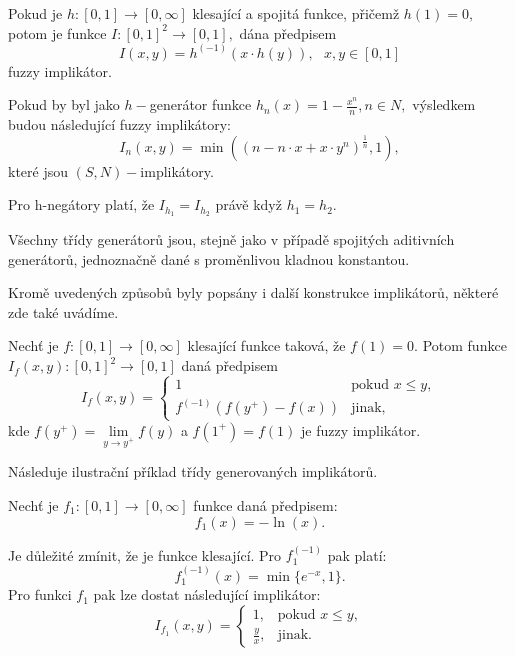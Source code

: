 \begin{sentence}\cite{Springer} 
Pokud je $h: [0,1] \to [0,\infty]$ klesající a spojitá funkce,
přičemž $h(1) = 0,$ potom je funkce $I: [0,1]^2 \to [0,1],$ dána předpisem
$$I(x,y) = h^{(-1)}(x \cdot h(y)), \mbox {   } x, y \in [0,1]$$
fuzzy implikátor. \\
\end{sentence}
\begin{example}
    Pokud by byl jako  $h-$generátor funkce $h_n(x) = 1- \frac {x^n}{n}, n
    \in N,$ výsledkem budou následující fuzzy implikátory:
    $$I_n(x,y) = \min \left ( (n - n \cdot x + x \cdot y^n)^{\frac 1n}, 1\right
    ),$$
    kter\'e jsou $(S,N)-$implikátory.
\end{example}
\begin{remark}
    Pro h-negátory platí, že $I_{h_1} = I_{h_2}$ právě když $h_1 = h_2.$
\end{remark}

Všechny třídy generátor\r u jsou, stejně jako v případě spojitých aditivních generátor\r u, jednoznačně dané s proměnlivou kladnou konstantou.

Krom\v e uveden\'ych zp\r usob\r u byly pops\'any i dal\v s\'i konstrukce implik\'ator\r u, n\v ekter\'e zde tak\'e uv\'ad\'ime.

\begin{sentence}
\cite{Springer}
    Nech\v t je  $f:[0,1]\rightarrow [0,\infty]$ klesající funkce taková, \v ze $f(1)=0$. 
Potom funkce $I_f(x,y):[0,1]^2\rightarrow [0,1]$ dan\'a předpisem
 $$I_f(x,y)=\begin{cases} 1 & \mbox{pokud $x \leq y$},\\
f^{(-1)}(f(y^+)-f(x)) & \mbox{jinak,} \end{cases}$$
kde $f(y^+)= \lim\limits_{y \to y^+}f(y)$ a $f(1^+)=f(1)$
je fuzzy implik\'ator. \\
\end{sentence}

Následuje ilustrační příklad třídy generovaných implikátor\r u.\\
\begin{example}
    Nech\v t je $f_1:[0,1] \rightarrow [0,
\infty]$ funkce daná předpisem:
 $$f_1(x)= -\ln(x).$$

Je d\r uležité zmínit, že je funkce klesající. Pro $f_1^{(-1)}$ pak platí:
 $$f_1^{(-1)}(x)=\min \{ e^{-x},1 \}.$$
Pro  funkci $f_1$ pak lze dostat následující implik\'ator:
$$I_{f_1}(x,y)= \begin{cases} 1,    &\mbox{pokud $x \leq y$}, \\
  \frac{y}{x},   & \mbox{jinak.} \end{cases}$$
\end{example}


